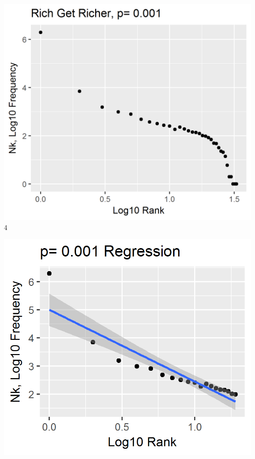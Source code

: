 \includegraphics{../images/Problem1_p0_001.png}4

\includegraphics{../images/Problem1_p0_001_lm.png}
